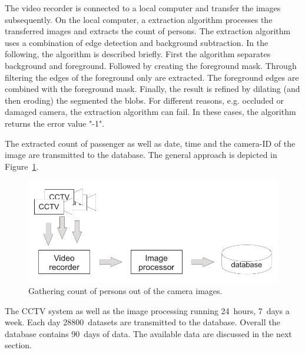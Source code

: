 The video recorder is connected to a local computer and transfer the images subsequently. On the local computer, a extraction algorithm processes the transferred images and extracts the count of persons.
The extraction algorithm uses a combination of edge detection and background subtraction. In the  following, the algorithm is described briefly.
First the algorithm separates background and foreground. Followed by creating the foreground mask.
Through filtering the edges of the foreground only are extracted. The foreground edges are combined with the foreground mask. Finally, the result is refined by dilating (and then eroding) the segmented the blobs.
For different reasons, e.g. occluded or damaged camera, the extraction algorithm can fail. In these cases, the algorithm returns the error value "-1".

The extracted count of passenger as well as date, time and the camera-ID of the image are transmitted to the database. The general approach is depicted in Figure~\ref{fig:CCTVimageProcessing}.

\begin{figure}%
  \centering
  \includegraphics[width=\linewidth]{Figures/imageProcessing.pdf} 
  \caption{Gathering count of persons out of the camera images.}
  \label{fig:CCTVimageProcessing}
\end{figure}

The CCTV system as well as the image processing running 24~hours, 7~days a week. Each day 28800~datasets are transmitted to the database. Overall the database contains 90~days of data. The available data are discussed in the next section.


